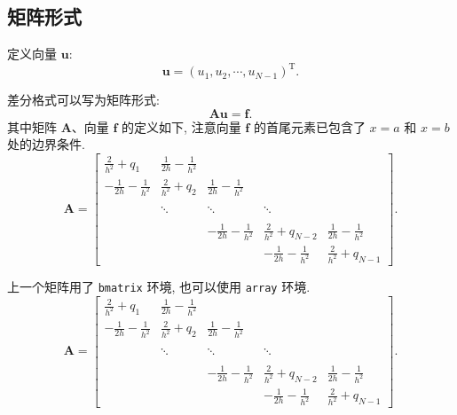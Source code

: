 \subsection{矩阵形式}

定义向量 $\boldsymbol{u}$:
\begin{equation*}
  \boldsymbol{u}=(u_{1}, u_{2}, \cdots, u_{N-1})^{\mathrm{T}}.
\end{equation*}

差分格式可以写为矩阵形式:
\begin{equation*}
  \boldsymbol{A}\boldsymbol{u}=\boldsymbol{f}.
\end{equation*}
其中矩阵 $\boldsymbol{A}$、向量 $\boldsymbol{f}$ 的定义如下, 注意向量 $\boldsymbol{f}$ 的首尾元素已包含了 $x=a$ 和 $x=b$ 处的边界条件.
\begin{equation}\label{eq:matrix1}
\boldsymbol{A}=\begin{bmatrix}
\frac{2}{h^{2}}+q_{1} & \frac{1}{2h}-\frac{1}{h^{2}} &   &  &  \\[8pt]
 -\frac{1}{2h}-\frac{1}{h^{2}} & \frac{2}{h^{2}}+q_{2} & \frac{1}{2h}-\frac{1}{h^{2}}  & &  \\[8pt]
  &  &  &  &    \\
  &  \ddots  & \ddots  &  \ddots  &  \\[8pt]
  &  &  &  &    \\
  &   & -\frac{1}{2h}-\frac{1}{h^{2}} & \frac{2}{h^{2}}+q_{N-2}& \frac{1}{2h}-\frac{1}{h^{2}} \\[8pt]
  &  &  & -\frac{1}{2h}-\frac{1}{h^{2}} & \frac{2}{h^{2}}+q_{N-1}
\end{bmatrix}.
\end{equation}

上一个矩阵用了 \verb|bmatrix| 环境, 也可以使用 \verb|array| 环境.
\begin{equation}\label{eq:matrix2}
\boldsymbol{A}=\left[\begin{array}{ccccc}
\frac{2}{h^{2}}+q_{1} & \frac{1}{2h}-\frac{1}{h^{2}} &  &  &  \\[8pt]
 -\frac{1}{2h}-\frac{1}{h^{2}} & \frac{2}{h^{2}}+q_{2} & \frac{1}{2h}-\frac{1}{h^{2}}  & &  \\[8pt]
  &  &  &  &   \\
  &  \ddots  & \ddots & \ddots &  \\[8pt]
  &  &  &  &   \\
  &   & -\frac{1}{2h}-\frac{1}{h^{2}} & \frac{2}{h^{2}}+q_{N-2} & \frac{1}{2h}-\frac{1}{h^{2}} \\[8pt]
  &  &  & -\frac{1}{2h}-\frac{1}{h^{2}} & \frac{2}{h^{2}}+q_{N-1}
\end{array}\right].
\end{equation}



